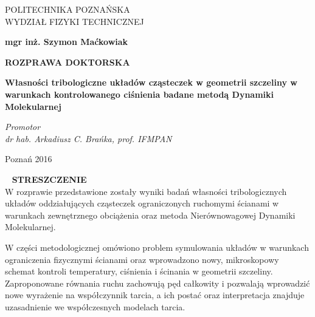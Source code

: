 \documentclass[12pt,a4paper,openright]{report} %
\begin{document}
%
%
\thispagestyle{empty}
\begin{center}
\large{POLITECHNIKA POZNAŃSKA \\
WYDZIAŁ FIZYKI TECHNICZNEJ}
\end{center}

\vspace{1cm}
\begin{center}
\large{\textbf{mgr inż. Szymon Maćkowiak}} \\
\end{center}

\vspace{2cm}

\begin{center}
\huge{\textbf{ROZPRAWA DOKTORSKA}}
\end{center}

\vspace{2cm}

\begin{center}
\large{\textbf{Własności tribologiczne układów cząsteczek w
geometrii szczeliny w warunkach kontrolowanego
ciśnienia badane metodą Dynamiki Molekularnej}}
\end{center}

\vspace{2cm}

\begin{center}
\textit{\large{Promotor \\ dr hab. Arkadiusz C. Brańka, prof. IFMPAN }}
\end{center}

\vspace{2cm}

\begin{center}
\large{Poznań 2016}
\end{center}
\newpage
%
%
\clearpage\thispagestyle{empty}
~
%
\clearpage\thispagestyle{empty}
\noindent
\textbf{STRESZCZENIE}
\\

W rozprawie przedstawione zostały wyniki badań własności tribologicznych układów oddziałujących cząsteczek ograniczonych ruchomymi ścianami w warunkach zewnętrznego obciążenia oraz metoda Nierównowagowej Dynamiki Molekularnej.

W części metodologicznej omówiono problem symulowania układów w warunkach ograniczenia fizycznymi ścianami oraz wprowadzono nowy, mikroskopowy schemat kontroli temperatury, ciśnienia i ścinania w geometrii szczeliny. Zaproponowane równania ruchu zachowują pęd całkowity i pozwalają wprowadzić nowe wyrażenie na współczynnik tarcia, a ich postać oraz interpretacja znajduje uzasadnienie we współczesnych modelach tarcia.
\end{document}
